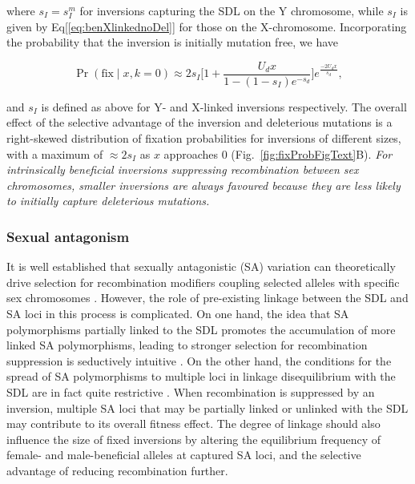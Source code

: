 \documentclass{article}
\begin{document}
\noindent where $s_I = s_{I}^{m}$ for inversions capturing the SDL on the Y chromosome, while $s_I$ is given by Eq[\ref{eq:benXlinkednoDel}] for those on the X-chromosome. Incorporating the probability that the inversion is initially mutation free, we have

\begin{equation} \label{eq:benPrFix}
	\Pr(\text{fix} \mid x, k = 0) \approx 2 s_I \Bigg[ 1+ \frac{U_d x}{1 - (1-s_I)e^{-s_d}} \Bigg] e^{\frac{-2U_d x}{s_d}},
\end{equation}

\noindent and $s_I$ is defined as above for Y- and X-linked inversions respectively. The overall effect of the selective advantage of the inversion and deleterious mutations is a right-skewed distribution of fixation probabilities for inversions of different sizes, with a maximum of $\approx 2 s_I$ as $x$ approaches $0$ (Fig.~\ref{fig:fixProbFigText}B). {\itshape For intrinsically beneficial inversions suppressing recombination between sex chromosomes, smaller inversions are always favoured because they are less likely to initially capture deleterious mutations.}


\subsubsection*{Sexual antagonism}\label{sec:SexAntag}

It is well established that sexually antagonistic (SA) variation can theoretically drive selection for recombination modifiers coupling selected alleles with specific sex chromosomes \cite[e.g.][]{Fisher1931,Nei1969, Charlesworth1978a, Charlesworth1980, Bull1983,Lenormand2003, Otto2019}. However, the role of pre-existing linkage between the SDL and SA loci in this process is complicated. On one hand, the idea that SA polymorphisms partially linked to the SDL promotes the accumulation of more linked SA polymorphisms, leading to stronger selection for recombination suppression is seductively intuitive \citep{Rice1984, Rice1996,Charlesworth2017, Otto2019}. On the other hand, the conditions for the spread of SA polymorphisms to multiple loci in linkage disequilibrium with the SDL are in fact quite restrictive \citep{Otto2019}. When recombination is suppressed by an inversion, multiple SA loci that may be partially linked or unlinked with the SDL may contribute to its overall fitness effect. The degree of linkage should also influence the size of fixed inversions by altering the equilibrium frequency of female- and male-beneficial alleles at captured SA loci, and the selective advantage of reducing recombination further.
\end{document}
